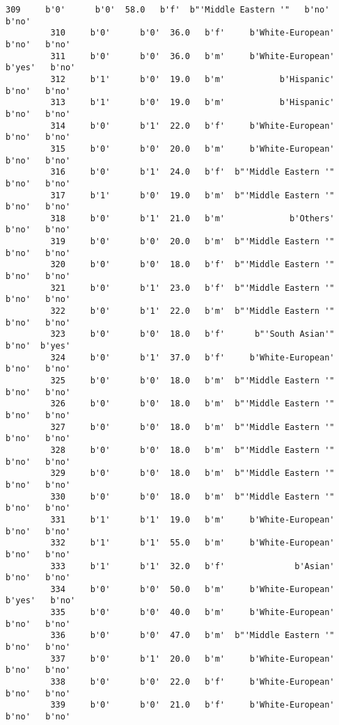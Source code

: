 \documentclass[11pt]{article}
\begin{document}
\begin{Verbatim}[commandchars=\\\{\}]
         309     b'0'      b'0'  58.0   b'f'  b"'Middle Eastern '"   b'no'   b'no'   
         310     b'0'      b'0'  36.0   b'f'     b'White-European'   b'no'   b'no'   
         311     b'0'      b'0'  36.0   b'm'     b'White-European'  b'yes'   b'no'   
         312     b'1'      b'0'  19.0   b'm'           b'Hispanic'   b'no'   b'no'   
         313     b'1'      b'0'  19.0   b'm'           b'Hispanic'   b'no'   b'no'   
         314     b'0'      b'1'  22.0   b'f'     b'White-European'   b'no'   b'no'   
         315     b'0'      b'0'  20.0   b'm'     b'White-European'   b'no'   b'no'   
         316     b'0'      b'1'  24.0   b'f'  b"'Middle Eastern '"   b'no'   b'no'   
         317     b'1'      b'0'  19.0   b'm'  b"'Middle Eastern '"   b'no'   b'no'   
         318     b'0'      b'1'  21.0   b'm'             b'Others'   b'no'   b'no'   
         319     b'0'      b'0'  20.0   b'm'  b"'Middle Eastern '"   b'no'   b'no'   
         320     b'0'      b'0'  18.0   b'f'  b"'Middle Eastern '"   b'no'   b'no'   
         321     b'0'      b'1'  23.0   b'f'  b"'Middle Eastern '"   b'no'   b'no'   
         322     b'0'      b'1'  22.0   b'm'  b"'Middle Eastern '"   b'no'   b'no'   
         323     b'0'      b'0'  18.0   b'f'      b"'South Asian'"   b'no'  b'yes'   
         324     b'0'      b'1'  37.0   b'f'     b'White-European'   b'no'   b'no'   
         325     b'0'      b'0'  18.0   b'm'  b"'Middle Eastern '"   b'no'   b'no'   
         326     b'0'      b'0'  18.0   b'm'  b"'Middle Eastern '"   b'no'   b'no'   
         327     b'0'      b'0'  18.0   b'm'  b"'Middle Eastern '"   b'no'   b'no'   
         328     b'0'      b'0'  18.0   b'm'  b"'Middle Eastern '"   b'no'   b'no'   
         329     b'0'      b'0'  18.0   b'm'  b"'Middle Eastern '"   b'no'   b'no'   
         330     b'0'      b'0'  18.0   b'm'  b"'Middle Eastern '"   b'no'   b'no'   
         331     b'1'      b'1'  19.0   b'm'     b'White-European'   b'no'   b'no'   
         332     b'1'      b'1'  55.0   b'm'     b'White-European'   b'no'   b'no'   
         333     b'1'      b'1'  32.0   b'f'              b'Asian'   b'no'   b'no'   
         334     b'0'      b'0'  50.0   b'm'     b'White-European'  b'yes'   b'no'   
         335     b'0'      b'0'  40.0   b'm'     b'White-European'   b'no'   b'no'   
         336     b'0'      b'0'  47.0   b'm'  b"'Middle Eastern '"   b'no'   b'no'   
         337     b'0'      b'1'  20.0   b'm'     b'White-European'   b'no'   b'no'   
         338     b'0'      b'0'  22.0   b'f'     b'White-European'   b'no'   b'no'   
         339     b'0'      b'0'  21.0   b'f'     b'White-European'   b'no'   b'no'   

\end{Verbatim}
\end{document}
